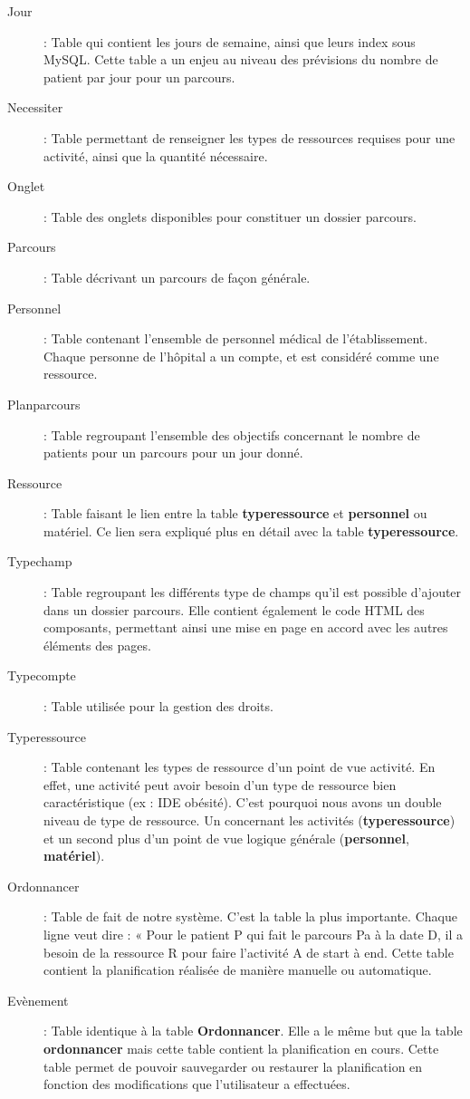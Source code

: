 \documentclass[noposter]{polytech/polytech}
\begin{document}
\begin{description}
	\item[Jour] : Table qui contient les jours de semaine, ainsi que leurs index sous MySQL. Cette table a un enjeu au niveau des prévisions du nombre de patient par jour pour un parcours.
	\item[Necessiter] : Table permettant de renseigner les types de ressources requises pour une activité, ainsi que la quantité nécessaire.
	\item[Onglet] : Table des onglets disponibles pour constituer un dossier parcours.
	\item[Parcours]	 : Table décrivant un parcours de façon générale.
	\item[Personnel] : Table contenant l'ensemble de personnel médical de l'établissement. Chaque personne de l'hôpital a un compte, et est considéré comme une ressource.
	\item[Planparcours] : Table regroupant l'ensemble des objectifs concernant le nombre de patients pour un parcours pour un jour donné.
	\item[Ressource] : Table faisant le lien entre la table \textbf{typeressource} et \textbf{personnel} ou matériel. Ce lien	sera expliqué plus en détail avec la table \textbf{typeressource}.
	\item[Typechamp] : Table regroupant les différents type de champs qu'il est possible d'ajouter dans un dossier parcours. Elle contient également le code HTML des composants, permettant ainsi une	mise en page en accord avec les autres éléments des pages.
	\item[Typecompte] : Table utilisée pour la gestion des droits.
	\item[Typeressource] : Table contenant les types de ressource d'un point de vue activité. En effet, une activité peut avoir besoin d'un type de ressource bien caractéristique (ex : IDE obésité). C'est pourquoi nous avons un double niveau de type de ressource. Un concernant les activités (\textbf{typeressource}) et un second plus d'un point de vue logique générale (\textbf{personnel}, \textbf{matériel}).
	\item[Ordonnancer] : Table de fait de notre système. C'est la table la plus importante. Chaque ligne veut dire : « Pour le patient P qui fait le parcours Pa à la date D, il a besoin de la ressource R pour faire l'activité A de start à end. Cette table contient la planification réalisée de manière manuelle ou automatique.
	\item[Evènement] : Table identique à la table \textbf{Ordonnancer}. Elle a le même but que la table \textbf{ordonnancer} mais cette table contient la planification en cours. Cette table permet de pouvoir sauvegarder ou restaurer la planification en fonction des modifications que l'utilisateur a effectuées.
\end{description}
\end{document}
